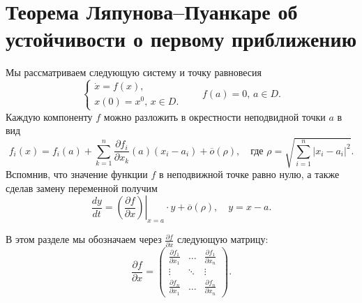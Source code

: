 \section{Теорема Ляпунова--Пуанкаре об устойчивости о первому приближению}


Мы рассматриваем следующую систему и точку равновесия
\begin{equation}\label{eq:ch5.main}
        \begin{cases}
                \dot x = f(x),\\
                x(0) = x^0,\, x \in D.
        \end{cases}
\qquad
        f(a) = 0,\,a \in D.
\end{equation}
Каждую компоненту $f$ можно разложить в окрестности неподвидной точки $a$ в вид
$$
        f_i(x) = f_i(a) + \sum_{k=1}^n \frac{\partial f_i}{\partial x_k}(a)(x_i - a_i) + \overline{o}(\rho),
\quad
        \mbox{где } \rho = \sqrt{\sum_{i = 1}^n |x_i - a_i|^2}.
$$
Вспомнив, что значение функции $f$ в неподвижной точке равно нулю, а также сделав замену переменной получим
$$
        \frac{dy}{dt} = \left.\left(
\frac{\partial f}{\partial x}
        \right)\right|_{x = a}\cdot y + \overline{o}(\rho),
\quad
        y = x - a.
$$
\begin{remark}
        В этом разделе мы обозначаем через $\frac{\partial f}{\partial x}$ следующую матрицу:
$$
\frac{\partial f}{\partial x}
=
        \begin{pmatrix}
\frac{\partial f_1}{\partial x_1}
& \ldots &
\frac{\partial f_1}{\partial x_n}
\\
\vdots & \ddots & \vdots \\
\frac{\partial f_n}{\partial x_1}
& \ldots &
\frac{\partial f_n}{\partial x_n}
        \end{pmatrix}.
$$
\end{remark}


